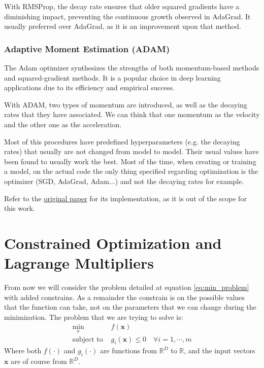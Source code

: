\documentclass[]{article}
\theoremstyle{definition}
\begin{document}
With RMSProp, the decay rate ensures that older squared gradients have a diminishing impact, preventing the continuous growth observed in AdaGrad. It usually preferred over AdaGrad, as it is an improvement upon that method.


\subsubsection{Adaptive Moment Estimation (ADAM)}
The Adam optimizer synthesizes the strengths of both momentum-based methods and squared-gradient methods. It is a popular choice in deep learning applications due to its efficiency and empirical success.

With ADAM, two types of momentum are introduced, as well as the decaying rates that they have associated. We can think that one momentum as the velocity and the other one as the acceleration.

Most of this procedures have predefined hyperparameters (e.g. the decaying rates) that usually are not changed from model to model. Their usual values have been found to usually work the best. Most of the time, when creating or training a model, on the actual code the only thing specified regarding optimization is the optimizer (SGD, AdaGrad, Adam...) and not the decaying rates for example.

Refer to the \href{https://arxiv.org/abs/1412.6980}{original paper} for its implementation, as it is out of the scope for this work. 


\section{Constrained Optimization and Lagrange Multipliers}
From now we will consider the problem detailed at equation \ref{eq:min_problem} with added constrains. As a remainder the constrain is on the possible values that the function can take, not on the parameters that we can change during the minimization. The problem that we are trying to solve is:
\begin{align}
	\min_x &f(\boldsymbol{x}) \\
	\text{subject to } &g_i(\boldsymbol{x}) \leq 0 \quad \forall i = 1,\cdots,m
\end{align}
Where both $f(\cdot)$ and $g_i(\cdot)$ are functions from $\mathbb{R}^D$ to $\mathbb{R}$, and the input vectors $\boldsymbol{x}$ are of course from $\mathbb{R}^D$. 
\end{document}

